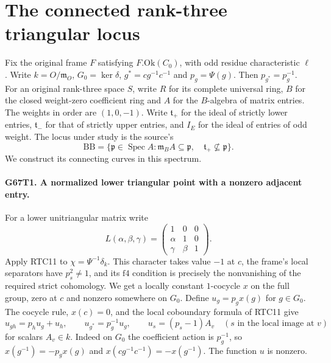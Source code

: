 \section{The connected rank-three triangular locus}

Fix the original frame $F$ satisfying $F.\mathrm{Ok}(C_0)$,
with odd residue characteristic $\ell$. Write $k=O/\mathfrak m_O$,
$G_0=\ker\delta$, $g^*=cg^{-1}c^{-1}$ and $p_g=\Psi(g)$.
Then $p_{g^*}=p_g^{-1}$. For an original rank-three space $S$,
write $R$ for its complete universal ring, $B$ for the closed
weight-zero coefficient ring and $A$ for the $B$-algebra of
matrix entries. The weights in order are $(1,0,-1)$.
Write $\mathfrak t_+$ for the ideal of strictly lower entries,
$\mathfrak t_-$ for that of strictly upper entries, and $I_E$
for the ideal of entries of odd weight. The locus under study is
the source's
\[
  \mathrm{BB}=\{\mathfrak p\in\operatorname{Spec} A:
      \mathfrak m_B A\subseteq\mathfrak p,\quad
      \mathfrak t_+\not\subseteq\mathfrak p\}.
\]
We construct its connecting curves in this spectrum.

\paragraph{G67T1. A normalized lower triangular point with a nonzero adjacent entry.}
For a lower unitriangular matrix write
\[
 L(\alpha,\beta,\gamma)=
 \begin{pmatrix}1&0&0\\\alpha&1&0\\\gamma&\beta&1\end{pmatrix}.
\]
Apply RTC11 to $\chi=\Psi^{-1}\delta_k$. This character takes
value $-1$ at $c$, the frame's local separators have $p_s^2\ne1$,
and its $\mathrm{f4}$ condition is precisely the nonvanishing of
the required strict cohomology. We get a locally constant
$1$-cocycle $x$ on the full group, zero at $c$ and nonzero somewhere
on $G_0$. Define $u_g=p_gx(g)$ for $g\in G_0$. The cocycle rule,
$x(c)=0$, and the local coboundary formula of RTC11 give
\[
 u_{gh}=p_hu_g+u_h,\qquad u_{g^*}=p_g^{-1}u_g,\qquad
 u_s=(p_s-1)A_v\quad(s\text{ in the local image at }v)
\]
for scalars $A_v\in k$. Indeed on $G_0$ the coefficient action is
$p_g^{-1}$, so $x(g^{-1})=-p_gx(g)$ and
$x(cg^{-1}c^{-1})=-x(g^{-1})$. The function $u$ is nonzero.

